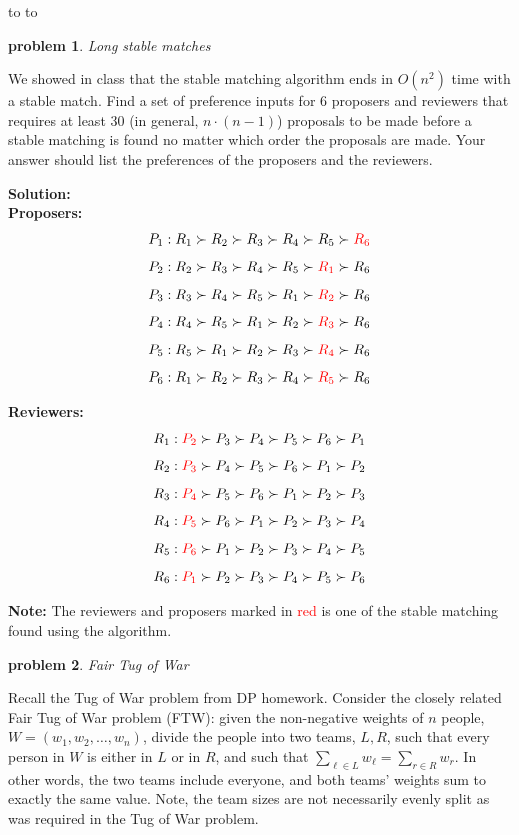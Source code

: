 \documentclass[11pt]{article}
\newcommand{\handout}{
   \renewcommand{\thepage}{H\hnumber-\arabic{page}}%
   \noindent%
   \begin{center}%
      \vbox{%
    \hbox to \columnwidth {\sc{\course} --- abhi shelat \hfill}%
    \vspace{-2mm}%
    \hbox to \columnwidth {\sc due \MakeLowercase{\duedate} \duelocation\hfill {\Huge\color{mdb}H\hnumber.\yourname}}%
      }
   \end{center}
   \vspace*{2mm}
}
\newtheorem{problem}{\sc\color{cit}problem}
\begin{document}
\handout


\begin{problem}
Long stable matches
\end{problem}

We showed in class that the stable matching algorithm ends in $O(n^2)$ time with a stable match.  Find a set of preference inputs for 6 proposers and reviewers that requires at least 30 (in general, $n\cdot(n-1)$) proposals to be made before a stable matching is found no matter which order the proposals are made.  Your answer  should list the preferences of the proposers and the reviewers. 

\noindent\textbf{Solution:}\\

\noindent\textbf{Proposers:}
$$P_1 : R_1 \succ R_2 \succ R_3 \succ R_4 \succ R_5 \succ \textcolor{red}{R_6}$$
$$P_2 : R_2 \succ R_3 \succ R_4 \succ R_5 \succ \textcolor{red}{R_1} \succ R_6$$
$$P_3 : R_3 \succ R_4 \succ R_5 \succ R_1 \succ \textcolor{red}{R_2} \succ R_6$$
$$P_4 : R_4 \succ R_5 \succ R_1 \succ R_2 \succ \textcolor{red}{R_3} \succ R_6$$
$$P_5 : R_5 \succ R_1 \succ R_2 \succ R_3 \succ \textcolor{red}{R_4} \succ R_6$$
$$P_6 : R_1 \succ R_2 \succ R_3 \succ R_4 \succ \textcolor{red}{R_5} \succ R_6$$

\noindent\textbf{Reviewers:}
$$R_1 : \textcolor{red}{P_2} \succ P_3 \succ P_4 \succ P_5 \succ P_6 \succ P_1$$
$$R_2 : \textcolor{red}{P_3} \succ P_4 \succ P_5 \succ P_6 \succ P_1 \succ P_2$$
$$R_3 : \textcolor{red}{P_4} \succ P_5 \succ P_6 \succ P_1 \succ P_2 \succ P_3$$
$$R_4 : \textcolor{red}{P_5} \succ P_6 \succ P_1 \succ P_2 \succ P_3 \succ P_4$$
$$R_5 : \textcolor{red}{P_6} \succ P_1 \succ P_2 \succ P_3 \succ P_4 \succ P_5$$
$$R_6 : \textcolor{red}{P_1} \succ P_2 \succ P_3 \succ P_4 \succ P_5 \succ P_6$$

\noindent \textbf{Note:} The reviewers and proposers marked in \textcolor{red}{red} is one of the stable matching found using the algorithm.

\newpage




\begin{problem}Fair Tug of War
\end{problem}

Recall the Tug of War problem from DP homework.  Consider the closely related Fair Tug of War problem (FTW): given the non-negative weights of $n$ people, $W=(w_1,w_2,\ldots,w_n)$, divide the people into two teams, $L,R$, such that every person in $W$ is either in $L$ or in $R$, and such that $\sum_{\ell\in L} w_\ell = \sum_{r\in R} w_r$. In other words, the two teams include everyone, and both teams' weights sum to exactly the same value.  Note, the team sizes are not necessarily evenly split as was required in the Tug of War problem.
\end{document}
